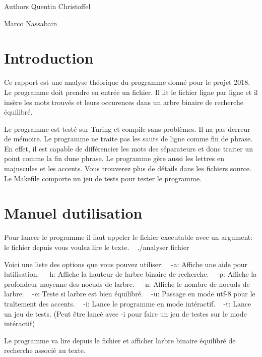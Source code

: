 \begin{DoxyAuthor}{Authors}
Quentin Christoffel 

Marco Nassabain
\end{DoxyAuthor}
\hypertarget{index_Introduction}{}\section{Introduction}\label{index_Introduction}
Ce rapport est une analyse théorique du programme donné pour le projet 2018. Le programme doit prendre en entrée un fichier. Il lit le fichier ligne par ligne et il insère les mots trouvés et leurs occurences dans un arbre binaire de recherche équilibré.

Le programme est testé sur Turing et compile sans problèmes. Il n\textquotesingle{}a pas d\textquotesingle{}erreur de mémoire. Le programme ne traite pas les sauts de ligne comme fin de phrase. En effet, il est capable de différencier les mots des séparateurs et donc traiter un point comme la fin d\textquotesingle{}une phrase. Le programme gère aussi les lettres en majuscules et les accents. Vous trouverez plus de détails dans les fichiers source. Le Makefile comporte un jeu de tests pour tester le programme.\hypertarget{index_Manuel}{}\section{Manuel d\textquotesingle{}utilisation}\label{index_Manuel}
Pour lancer le programme il faut appeler le fichier executable avec un argument\+: le fichier depuis vous voulez lire le texte. ~\newline
 ./analyser fichier ~\newline


Voici une liste des options que vous pouvez utiliser\+: ~\newline
 -\/a\+: Affiche une aide pour l\textquotesingle{}utilisation. ~\newline
 -\/h\+: Affiche la hauteur de l\textquotesingle{}arbre binaire de recherche. ~\newline
 -\/p\+: Affiche la profondeur moyenne des noeuds de l\textquotesingle{}arbre. ~\newline
 -\/n\+: Affiche le nombre de noeuds de l\textquotesingle{}arbre. ~\newline
 -\/e\+: Teste si l\textquotesingle{}arbre est bien équilibré. ~\newline
 -\/u\+: Passage en mode utf-\/8 pour le traîtement des accents. ~\newline
 -\/i\+: Lance le programme en mode intéractif. ~\newline
 -\/t\+: Lance un jeu de tests. (Peut être lancé avec -\/i pour faire un jeu de testes sur le mode intéractif) ~\newline


Le programme va lire depuis le fichier et afficher l\textquotesingle{}arbre binaire équilibré de recherche associé au texte. 